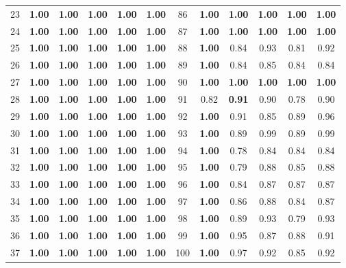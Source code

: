 \documentclass{article}
\begin{document}
{\begin{longtable}{cccccc@{\qquad}cccccc}
23 & \textbf{1.00} & \textbf{1.00} & \textbf{1.00} & \textbf{1.00} & \textbf{1.00} & 86 & \textbf{1.00} & \textbf{1.00} & \textbf{1.00} & \textbf{1.00} & \textbf{1.00} \\
24 & \textbf{1.00} & \textbf{1.00} & \textbf{1.00} & \textbf{1.00} & \textbf{1.00} & 87 & \textbf{1.00} & \textbf{1.00} & \textbf{1.00} & \textbf{1.00} & \textbf{1.00} \\
25 & \textbf{1.00} & \textbf{1.00} & \textbf{1.00} & \textbf{1.00} & \textbf{1.00} & 88 & \textbf{1.00} & 0.84 & 0.93 & 0.81 & 0.92 \\
26 & \textbf{1.00} & \textbf{1.00} & \textbf{1.00} & \textbf{1.00} & \textbf{1.00} & 89 & \textbf{1.00} & 0.84 & 0.85 & 0.84 & 0.84 \\
27 & \textbf{1.00} & \textbf{1.00} & \textbf{1.00} & \textbf{1.00} & \textbf{1.00} & 90 & \textbf{1.00} & \textbf{1.00} & \textbf{1.00} & \textbf{1.00} & \textbf{1.00} \\
28 & \textbf{1.00} & \textbf{1.00} & \textbf{1.00} & \textbf{1.00} & \textbf{1.00} & 91 & 0.82 & \textbf{0.91} & 0.90 & 0.78 & 0.90 \\
29 & \textbf{1.00} & \textbf{1.00} & \textbf{1.00} & \textbf{1.00} & \textbf{1.00} & 92 & \textbf{1.00} & 0.91 & 0.85 & 0.89 & 0.96 \\
30 & \textbf{1.00} & \textbf{1.00} & \textbf{1.00} & \textbf{1.00} & \textbf{1.00} & 93 & \textbf{1.00} & 0.89 & 0.99 & 0.89 & 0.99 \\
31 & \textbf{1.00} & \textbf{1.00} & \textbf{1.00} & \textbf{1.00} & \textbf{1.00} & 94 & \textbf{1.00} & 0.78 & 0.84 & 0.84 & 0.84 \\
32 & \textbf{1.00} & \textbf{1.00} & \textbf{1.00} & \textbf{1.00} & \textbf{1.00} & 95 & \textbf{1.00} & 0.79 & 0.88 & 0.85 & 0.88 \\
33 & \textbf{1.00} & \textbf{1.00} & \textbf{1.00} & \textbf{1.00} & \textbf{1.00} & 96 & \textbf{1.00} & 0.84 & 0.87 & 0.87 & 0.87 \\
34 & \textbf{1.00} & \textbf{1.00} & \textbf{1.00} & \textbf{1.00} & \textbf{1.00} & 97 & \textbf{1.00} & 0.86 & 0.88 & 0.84 & 0.87 \\
35 & \textbf{1.00} & \textbf{1.00} & \textbf{1.00} & \textbf{1.00} & \textbf{1.00} & 98 & \textbf{1.00} & 0.89 & 0.93 & 0.79 & 0.93 \\
36 & \textbf{1.00} & \textbf{1.00} & \textbf{1.00} & \textbf{1.00} & \textbf{1.00} & 99 & \textbf{1.00} & 0.95 & 0.87 & 0.88 & 0.91 \\
37 & \textbf{1.00} & \textbf{1.00} & \textbf{1.00} & \textbf{1.00} & \textbf{1.00} & 100 & \textbf{1.00} & 0.97 & 0.92 & 0.85 & 0.92 \\

\end{longtable}}
\end{document}
